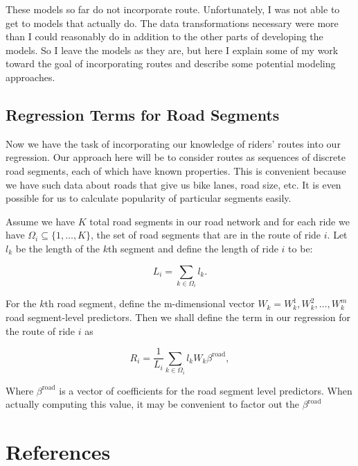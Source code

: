 \documentclass[12pt,twoside]{reedthesis}
\begin{document}
  These models so far do not incorporate route. Unfortunately, I was not
  able to get to models that actually do. The data transformations
  necessary were more than I could reasonably do in addition to the other
  parts of developing the models. So I leave the models as they are, but
  here I explain some of my work toward the goal of incorporating routes
  and describe some potential modeling approaches.
  
  \section{Regression Terms for Road
  Segments}\label{regression-terms-for-road-segments}
  
  Now we have the task of incorporating our knowledge of riders' routes
  into our regression. Our approach here will be to consider routes as
  sequences of discrete road segments, each of which have known
  properties. This is convenient because we have such data about roads
  that give us bike lanes, road size, etc. It is even possible for us to
  calculate popularity of particular segments easily.
  
  Assume we have \(K\) total road segments in our road network and for
  each ride we have \(\Omega_i \subseteq \{1, \ldots, K\}\), the set of
  road segments that are in the route of ride \(i\). Let \(l_k\) be the
  length of the \(k\)th segment and define the length of ride \(i\) to be:
  
  \[ L_i = \sum_{k \in \Omega_i} l_k.\]
  
  For the \(k\)th road segment, define the m-dimensional vector
  \(W_k = W_k^1, W_k^2, \ldots, W_k^m\) road segment-level predictors.
  Then we shall define the term in our regression for the route of ride
  \(i\) as
  
  \[ R_i = \frac{1}{L_i} \sum_{k \in \Omega_i} l_k W_k \beta^{\text{road}},\]
  
  Where \(\beta^{\text{road}}\) is a vector of coefficients for the road
  segment level predictors. When actually computing this value, it may be
  convenient to factor out the \(\beta^{\text{road}}\)
  
  \backmatter
  
  \chapter{References}\label{references}
  
  \noindent
  
  \setlength{\parindent}{-0.20in} \setlength{\leftskip}{0.20in}
  \setlength{\parskip}{8pt}
  
\end{document}
